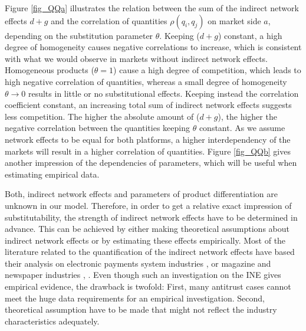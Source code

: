 \documentclass[12pt,a4paper,notitlepage]{article}
\begin{document}

Figure \ref{fig_QQa} illustrates the relation between the sum of the indirect network effects $d+g$ and the correlation of quantities $\rho(q_i,q_j)$ on market side $a$, depending on the substitution parameter $\theta$. Keeping ($d+g$) constant, a high degree of homogeneity causes negative correlations to increase, which is consistent with what we would observe in markets without indirect network effects. Homogeneous products ($\theta=1$) cause a high degree of competition, which leads to high negative correlation of quantities, whereas a small degree of homogeneity $\theta \to 0$ results in little or no substitutional effects. Keeping instead the correlation coefficient constant, an increasing total sum of indirect network effects suggests less competition. The higher the absolute amount of ($d+g$), the higher the negative correlation between the quantities keeping $\theta$ constant. As we assume network effects to be equal for both platforms, a higher interdependency of the markets will result in a higher correlation of quantities. Figure \ref{fig_QQb} gives another impression of the dependencies of parameters, which will be useful when estimating empirical data.  

Both, indirect network effects and parameters of product differentiation are unknown in our model. Therefore, in order to get a relative exact impression of substitutability, the strength of indirect network effects have to be determined in advance. This can be achieved by either making theoretical assumptions about indirect network effects or by estimating these effects empirically. Most of the literature related to the quantification of the indirect network effects have based their analysis on electronic payments system industries \citep{ackerberg_quantifying_2006}, \citep{rysman_empirical_2007} or magazine and newspaper industries \citep{kaiser_price_2006}, \citep{argentesi_estimating_2007}. Even though such an investigation on the INE gives empirical evidence, the drawback is twofold: First, many antitrust cases cannot meet the huge data requirements for an empirical investigation. Second, theoretical assumption have to be made that might not reflect the industry characteristics adequately. 
\end{document}
